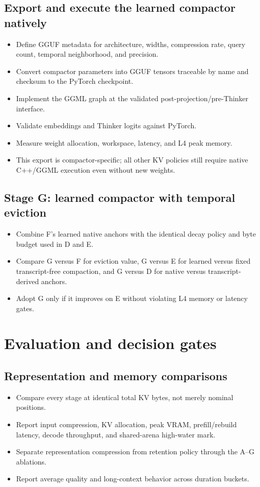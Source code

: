 \documentclass[10pt,letterpaper]{article}
\begin{document}
\subsection{Export and execute the learned compactor natively}
\begin{itemize}
    \item Define GGUF metadata for architecture, widths, compression rate, query count, temporal neighborhood, and precision.
    \item Convert compactor parameters into GGUF tensors traceable by name and checksum to the PyTorch checkpoint.
    \item Implement the GGML graph at the validated post-projection/pre-Thinker interface.
    \item Validate embeddings and Thinker logits against PyTorch.
    \item Measure weight allocation, workspace, latency, and L4 peak memory.
    \item This export is compactor-specific; all other KV policies still require native C++/GGML execution even without new weights.
\end{itemize}

\subsection{Stage G: learned compactor with temporal eviction}
\begin{itemize}
    \item Combine F's learned native anchors with the identical decay policy and byte budget used in D and E.
    \item Compare G versus F for eviction value, G versus E for learned versus fixed transcript-free compaction, and G versus D for native versus transcript-derived anchors.
    \item Adopt G only if it improves on E without violating L4 memory or latency gates.
\end{itemize}

\section{Evaluation and decision gates}

\subsection{Representation and memory comparisons}
\begin{itemize}
    \item Compare every stage at identical total KV bytes, not merely nominal positions.
    \item Report input compression, KV allocation, peak VRAM, prefill/rebuild latency, decode throughput, and shared-arena high-water mark.
    \item Separate representation compression from retention policy through the A--G ablations.
    \item Report average quality and long-context behavior across duration buckets.
\end{itemize}
\end{document}
